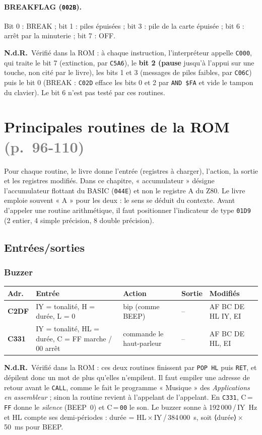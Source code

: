 \documentclass[a4paper,10pt]{article}
\makeatletter
\newcommand{\hex}[1]{\texttt{#1}}
\newcommand{\reg}[1]{\textsf{#1}}
\newcommand{\pg}[1]{\texorpdfstring{\textcolor{gray}{\small(p.~#1)}}{}}
\newcommand{\nota}[1]{\textcolor{red!60!black}{\small\textbf{N.d.R.}~#1}}
\newenvironment{routines}
  {\small\begin{longtable}{@{}>{\ttfamily\bfseries}p{1.1cm}>{\raggedright}p{4.0cm}>{\raggedright}p{5.0cm}>{\raggedright}p{3.1cm}>{\raggedright\arraybackslash}p{2.1cm}@{}}
   \toprule
   \normalfont\bfseries Adr. & \textbf{Entrée} & \textbf{Action} & \textbf{Sortie} & \textbf{Modifiés}\\
   \midrule\endhead
   \bottomrule\endfoot}
  {\end{longtable}}
\makeatother
\begin{document}
\paragraph{BREAKFLAG (\hex{002B}).} Bit 0 : BREAK ; bit 1 : piles épuisées ;
bit 3 : pile de la carte épuisée ; bit 6 : arrêt par la minuterie ;
bit 7 : OFF.

\nota{Vérifié dans la ROM : à chaque instruction, l'interpréteur appelle
\hex{C000}, qui traite le bit 7 (extinction, par \hex{C5A6}), le
\textbf{bit 2 (pause} jusqu'à l'appui sur une touche, non cité par le
livre), les bits 1 et 3 (messages de piles faibles, par \hex{C06C}) puis le
bit 0 (BREAK : \hex{C02D} efface les bits 0 et 2 par \texttt{AND \$FA} et
vide le tampon du clavier). Le bit 6 n'est pas testé par ces routines.}

\section{Principales routines de la ROM \pg{96-110}}\label{sec:routines}

Pour chaque routine, le livre donne l'entrée (registres à charger),
l'action, la sortie et les registres modifiés. Dans ce chapitre,
« accumulateur » désigne l'accumulateur flottant du BASIC (\hex{044E}) et
non le registre \reg{A} du Z80. Le livre emploie souvent « A » pour les
deux : le sens se déduit du contexte. Avant d'appeler une routine
arithmétique, il faut positionner l'indicateur de type \hex{01D9}
(2 entier, 4 simple précision, 8 double précision).

\subsection{Entrées/sorties}
\subsubsection*{Buzzer}
\begin{routines}
C2DF & IY = tonalité, H = durée, L = 0 & bip (comme BEEP) & -- & AF BC DE HL IY, EI \\
C331 & IY = tonalité, HL = durée, C = FF marche / 00 arrêt & commande le haut-parleur & -- & AF BC DE HL, EI \\
\end{routines}
\nota{Vérifié dans la ROM : ces deux routines finissent par \texttt{POP HL}
puis \texttt{RET}, et dépilent donc un mot de plus qu'elles n'empilent. Il
faut empiler une adresse de retour avant le \texttt{CALL}, comme le fait le
programme « Musique » des \emph{Applications en assembleur} ; sinon la routine
revient à l'appelant de l'appelant. En \hex{C331}, C\,=\,\hex{FF} donne
le \emph{silence} (BEEP~0) et C\,=\,\hex{00} le son. Le buzzer sonne à
192\,000\,/\,IY~Hz et HL compte ses demi-périodes : durée = HL\,×\,IY\,/\,384\,000~s,
soit ⟨durée⟩\,×\,50~ms pour BEEP.}
\end{document}
